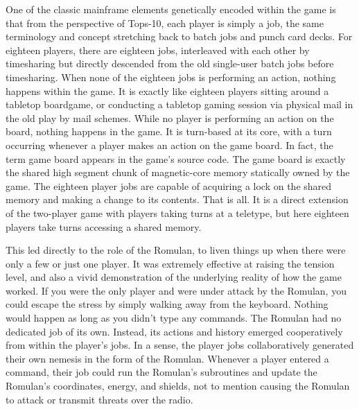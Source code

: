 One of the classic mainframe elements genetically encoded within the game is that from the perspective of Tops-10, each player is simply a job, the same terminology and concept stretching back to batch jobs and punch card decks. For eighteen players, there are eighteen jobs, interleaved with each other by timesharing but directly descended from the old single-user batch jobs before timesharing. When none of the eighteen jobs is performing an action, nothing happens within the game. It is exactly like eighteen players sitting around a tabletop boardgame, or conducting a tabletop gaming session via physical mail in the old play by mail schemes. While no player is performing an action on the board, nothing happens in the game. It is turn-based at its core, with a turn occurring whenever a player makes an action on the game board. In fact, the term game board appears in the game’s source code. The game board is exactly the shared high segment chunk of magnetic-core memory statically owned by the game. The eighteen player jobs are capable of acquiring a lock on the shared memory and making a change to its contents. That is all. It is a direct extension of the two-player game with players taking turns at a teletype, but here eighteen players take turns accessing a shared memory.

This led directly to the role of the Romulan, to liven things up when there were only a few or just one player. It was extremely effective at raising the tension level, and also a vivid demonstration of the underlying reality of how the game worked. If you were the only player and were under attack by the Romulan, you could escape the stress by simply walking away from the keyboard. Nothing would happen as long as you didn’t type any commands. The Romulan had no dedicated job of its own. Instead, its actions and history emerged cooperatively from within the player’s jobs. In a sense, the player jobs collaboratively generated their own nemesis in the form of the Romulan. Whenever a player entered a command, their job could run the Romulan's subroutines and update the Romulan’s coordinates, energy, and shields, not to mention causing the Romulan to attack or transmit threats over the radio.

